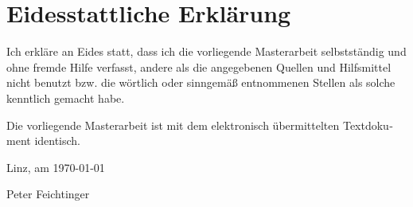 \chapter{Eidesstattliche Erklärung}
\begin{otherlanguage}{ngerman}

Ich erkläre an Eides statt, dass ich die vorliegende Masterarbeit selbstständig und ohne fremde Hilfe verfasst, andere 
als die angegebenen Quellen und Hilfsmittel nicht benutzt bzw. die wörtlich oder sinngemäß entnommenen Stellen als 
solche kenntlich gemacht habe.

Die vorliegende Masterarbeit ist mit dem elektronisch übermittelten Textdokument identisch.


Linz, am \today

\hfill Peter Feichtinger

\end{otherlanguage}
